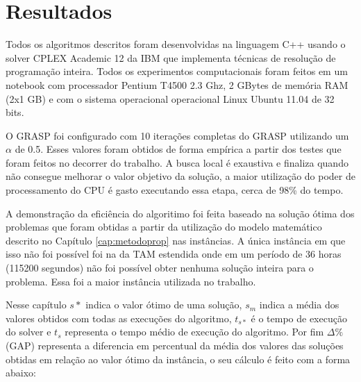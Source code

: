   \chapter{Resultados}


Todos os algoritmos descritos foram desenvolvidas na linguagem C++ usando o
solver CPLEX Academic 12 da IBM que implementa técnicas de resolução de
programação inteira. Todos os experimentos computacionais foram feitos em um
notebook com processador Pentium T4500 2.3 Ghz, 2 GBytes de memória RAM (2x1 GB)
e com o sistema operacional operacional Linux Ubuntu 11.04 de 32 bits.

O GRASP foi configurado com 10 iterações completas do GRASP utilizando um
$\alpha$ de 0.5. Esses valores foram obtidos de forma empírica a partir
dos testes que foram feitos no decorrer do trabalho. A busca local é exaustiva
e finaliza quando não consegue melhorar o valor objetivo da solução,
a maior utilização do poder de processamento do CPU é gasto executando essa
etapa, cerca de 98\% do tempo.


A demonstração da eficiência do algoritimo foi feita baseado na solução ótima
dos problemas que foram obtidas a partir da utilização do modelo
matemático descrito no Capítulo \ref{cap:metodoprop} nas instâncias. A única
instância em que isso não foi possível foi na da TAM estendida onde em um
período de 36 horas (115200 segundos) não foi possível obter nenhuma solução
inteira para o problema. Essa foi a maior instância utilizada no trabalho.

Nesse capítulo $s*$ indica o valor ótimo de uma solução, $s_{m}$ indica a média
dos valores obtidos com todas as execuções do algoritmo, $t_{s*}$ é o
tempo de execução do solver e $t_{s}$ representa o tempo médio de execução do
algoritmo. Por fim $\Delta \%$ (GAP) representa a diferencia em percentual da
média dos valores das soluções obtidas em relação ao valor ótimo da instância,
o seu cálculo é feito com a forma abaixo:

